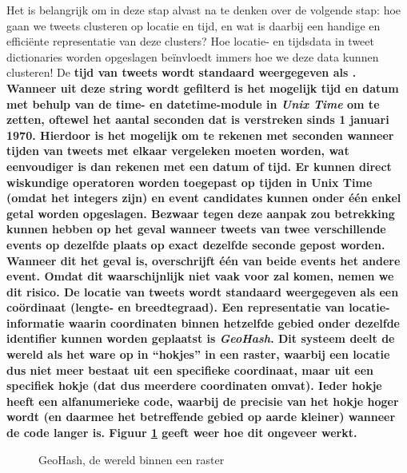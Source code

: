 {{Het is belangrijk om in deze stap alvast na te denken over de volgende stap: hoe 
gaan we tweets clusteren op locatie en tijd, en wat is daarbij een handige en 
effici\"ente representatie van deze clusters? Hoe locatie- en tijdsdata in tweet 
dictionaries worden opgeslagen beïnvloedt immers hoe we deze data kunnen 
clusteren! 
\vl
De \bf{tijd} van tweets wordt standaard weergegeven als . Wanneer uit deze string  wordt gefilterd is het mogelijk tijd en datum met behulp van 
de time- en datetime-module in \bf{\it{Unix Time}} om te zetten, oftewel het aantal 
seconden dat is verstreken sinds 1 januari 1970. Hierdoor is het mogelijk om te 
rekenen met seconden wanneer tijden van tweets met elkaar vergeleken moeten 
worden, wat eenvoudiger is dan rekenen met een datum of tijd. Er kunnen direct 
wiskundige operatoren worden toegepast op tijden in Unix Time (omdat het 
integers zijn) en event candidates kunnen onder één enkel getal worden 
opgeslagen. Bezwaar tegen deze aanpak zou betrekking kunnen hebben op het geval 
wanneer tweets van twee verschillende events op dezelfde plaats op exact 
dezelfde seconde gepost worden. Wanneer dit het geval is, overschrijft één van 
beide events het andere event. Omdat dit waarschijnlijk niet vaak voor zal 
komen, nemen we dit risico.
\vl
De \bf{locatie} van tweets wordt standaard weergegeven als een co\"ordinaat (lengte- en 
breedtegraad). Een representatie van locatie-informatie waarin coordinaten 
binnen hetzelfde gebied onder dezelfde identifier kunnen worden geplaatst is 
\bf{\it{GeoHash}}. Dit systeem deelt de wereld als het ware op in “hokjes” in een raster, 
waarbij een locatie dus niet meer bestaat uit een specifieke coordinaat, maar 
uit een specifiek hokje (dat dus meerdere coordinaten omvat). Ieder hokje heeft 
een alfanumerieke code, waarbij de precisie van het hokje hoger wordt (en 
daarmee het betreffende gebied op aarde kleiner) wanneer de code langer is. 
Figuur \ref{geohash} geeft weer hoe dit ongeveer werkt.

\begin{figure}[H]
  \centering
    \caption{GeoHash, de wereld binnen een raster}
  \label{geohash}
\end{figure}

}}
